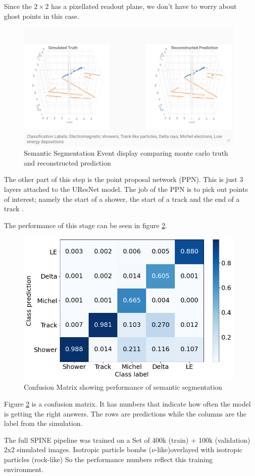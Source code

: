 Since the $2 \times 2$ has a pixellated readout plane, we don't have to worry about ghost points in this case.

\begin{figure}[H]
  \centering
  \includegraphics[width=120mm]{figures/semanticEvent.png}
  \caption{Semantic Segmentation Event display comparing monte carlo truth and reconstructed prediction}
  \label{semanticEvent}
\end{figure}

The other part of this step is the point proposal network (PPN).
This is just 3 layers attached to the UResNet model.
The job of the PPN is to pick out points of interest; namely the start of a shower, the start of a track and the end of a track \cite{Tilley_2021}.

The performance of this stage can be seen in figure \ref{semanticPerformance}.

\begin{figure}[H]
  \centering
  \includegraphics[width=120mm]{figures/semanticPerformance.png}
  \caption{Confusion Matrix showing performance of semantic segmentation}
  \label{semanticPerformance}
\end{figure}

Figure \ref{semanticPerformance}  is a confusion matrix. It has numbers that indicate how often the model is getting the right answers. The rows are predictions while the columns are the label from the simulation.

The full SPINE pipeline was trained on a Set of 400k (train) + 100k (validation) 2x2 simulated images.
Isotropic particle bombs ($\nu$-like)overlayed with isotropic particles (rock-like)
So the performance numbers reflect this training environment.






